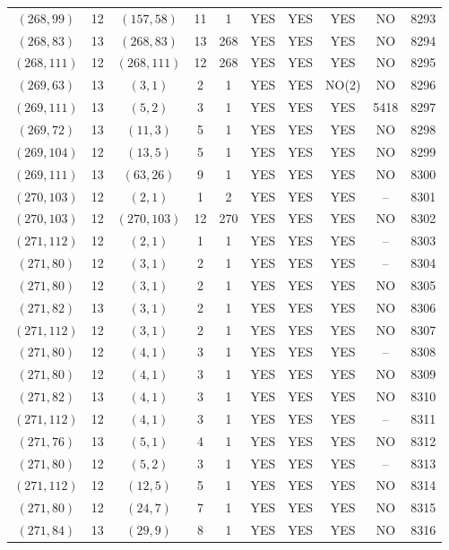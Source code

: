 \begin{longtable}{|c|c|c|c|c|c|c|c|c|c|}
$(268, 99)$ & 12 & $(157, 58)$ & 11 & 1 & YES & YES & YES & NO & 8293\\
$(268, 83)$ & 13 & $(268, 83)$ & 13 & 268 & YES & YES & YES & NO & 8294\\
$(268, 111)$ & 12 & $(268, 111)$ & 12 & 268 & YES & YES & YES & NO & 8295\\
$(269, 63)$ & 13 & $(3, 1)$ & 2 & 1 & YES & YES & NO(2) & NO & 8296\\
$(269, 111)$ & 13 & $(5, 2)$ & 3 & 1 & YES & YES & YES & 5418 & 8297\\
$(269, 72)$ & 13 & $(11, 3)$ & 5 & 1 & YES & YES & YES & NO & 8298\\
$(269, 104)$ & 12 & $(13, 5)$ & 5 & 1 & YES & YES & YES & NO & 8299\\
$(269, 111)$ & 13 & $(63, 26)$ & 9 & 1 & YES & YES & YES & NO & 8300\\
$(270, 103)$ & 12 & $(2, 1)$ & 1 & 2 & YES & YES & YES & -- & 8301\\
$(270, 103)$ & 12 & $(270, 103)$ & 12 & 270 & YES & YES & YES & NO & 8302\\
$(271, 112)$ & 12 & $(2, 1)$ & 1 & 1 & YES & YES & YES & -- & 8303\\
$(271, 80)$ & 12 & $(3, 1)$ & 2 & 1 & YES & YES & YES & -- & 8304\\
$(271, 80)$ & 12 & $(3, 1)$ & 2 & 1 & YES & YES & YES & NO & 8305\\
$(271, 82)$ & 13 & $(3, 1)$ & 2 & 1 & YES & YES & YES & NO & 8306\\
$(271, 112)$ & 12 & $(3, 1)$ & 2 & 1 & YES & YES & YES & NO & 8307\\
$(271, 80)$ & 12 & $(4, 1)$ & 3 & 1 & YES & YES & YES & -- & 8308\\
$(271, 80)$ & 12 & $(4, 1)$ & 3 & 1 & YES & YES & YES & NO & 8309\\
$(271, 82)$ & 13 & $(4, 1)$ & 3 & 1 & YES & YES & YES & NO & 8310\\
$(271, 112)$ & 12 & $(4, 1)$ & 3 & 1 & YES & YES & YES & -- & 8311\\
$(271, 76)$ & 13 & $(5, 1)$ & 4 & 1 & YES & YES & YES & NO & 8312\\
$(271, 80)$ & 12 & $(5, 2)$ & 3 & 1 & YES & YES & YES & -- & 8313\\
$(271, 112)$ & 12 & $(12, 5)$ & 5 & 1 & YES & YES & YES & NO & 8314\\
$(271, 80)$ & 12 & $(24, 7)$ & 7 & 1 & YES & YES & YES & NO & 8315\\
$(271, 84)$ & 13 & $(29, 9)$ & 8 & 1 & YES & YES & YES & NO & 8316\\

\end{longtable}
